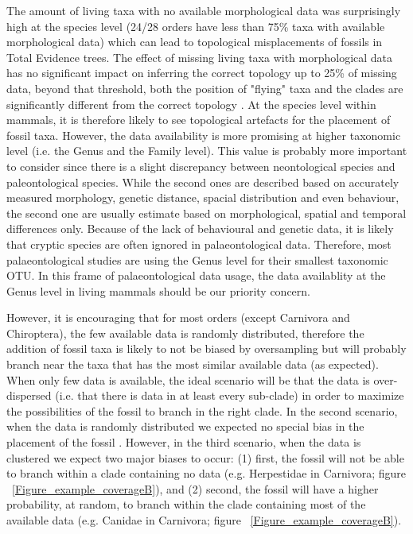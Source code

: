 \documentclass[12pt,letterpaper]{article}
\renewcommand{\subsection}[1]{%
\bigskip
\begin{center}
\begin{large}
\normalfont\itshape #1
\end{large}
\end{center}}
\begin{document}
The amount of living taxa with no available morphological data was surprisingly high at the species level (24/28 orders have less than 75\% taxa with available morphological data) which can lead to topological misplacements of fossils in Total Evidence trees. The effect of missing living taxa with morphological data has no significant impact on inferring the correct topology up to 25\% of missing data, beyond that threshold, both the position of "flying" taxa and the clades are significantly different from the correct topology \cite{GuillermeCooper}. At the species level within mammals, it is therefore likely to see topological artefacts for the placement of fossil taxa. However, the data availability is more promising at higher taxonomic level (i.e. the Genus and the Family level). This value is probably more important to consider since there is a slight discrepancy between neontological species and paleontological species. While the second ones are described based on accurately measured morphology, genetic distance, spacial distribution and even behaviour, the second one are usually estimate based on morphological, spatial and temporal differences only. Because of the lack of behavioural and genetic data, it is likely that cryptic species are often ignored in palaeontological data. Therefore, most palaeontological studies are using the Genus level for their smallest taxonomic OTU. In this frame of palaeontological data usage, the data availablity at the Genus level in living mammals should be our priority concern.

However, it is encouraging that for most orders (except Carnivora and Chiroptera), the few available data is randomly distributed, therefore the addition of fossil taxa is likely to not be biased by oversampling but will probably branch near the taxa that has the most similar available data (as expected). When only few data is available, the ideal scenario will be that the data is over-dispersed (i.e. that there is data in at least every sub-clade) in order to maximize the possibilities of the fossil to branch in the right clade. In the second scenario, when the data is randomly distributed we expected no special bias in the placement of the fossil \cite{GuillermeCooper}. However, in the third scenario, when the data is clustered we expect two major biases to occur: (1) first, the fossil will not be able to branch within a clade containing no data (e.g. Herpestidae in Carnivora; figure ~\ref{Figure_example_coverageB}), and (2) second, the fossil will have a higher probability, at random, to branch within the clade containing most of the available data (e.g. Canidae in Carnivora; figure ~\ref{Figure_example_coverageB}).
\end{document}

